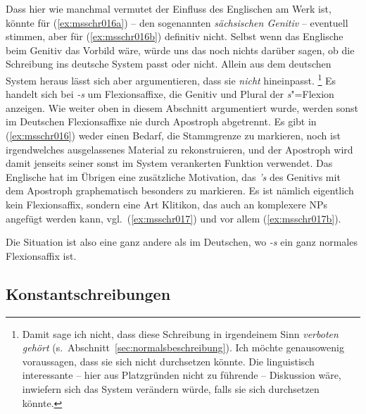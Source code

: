 Dass hier wie manchmal vermutet der Einfluss des Englischen am Werk ist, könnte für (\ref{ex:msschr016a}) -- den sogenannten \textit{sächsischen Genitiv} -- eventuell stimmen, aber für (\ref{ex:msschr016b}) definitiv nicht.
Selbst wenn das Englische beim Genitiv das Vorbild wäre, würde uns das noch nichts darüber sagen, ob die Schreibung ins deutsche System passt oder nicht.
Allein aus dem deutschen System heraus lässt sich aber argumentieren, dass sie \textit{nicht} hineinpasst.%
\footnote{Damit sage ich nicht, dass diese Schreibung in irgendeinem Sinn \textit{verboten gehört} (s.\ Abschnitt~\ref{sec:normalsbeschreibung}).
Ich möchte genausowenig voraussagen, dass sie sich nicht durchsetzen könnte.
Die linguistisch interessante -- hier aus Platzgründen nicht zu führende -- Diskussion wäre, inwiefern sich das System verändern würde, falls sie sich durchsetzen könnte.}
Es handelt sich bei \textit{-s} um Flexionsaffixe, die Genitiv und Plural der \textit{s}"=Flexion anzeigen.
Wie weiter oben in diesem Abschnitt argumentiert wurde, werden sonst im Deutschen Flexionsaffixe nie durch Apostroph abgetrennt.
Es gibt in (\ref{ex:msschr016}) weder einen Bedarf, die Stammgrenze zu markieren, noch ist irgendwelches ausgelassenes Material zu rekonstruieren, und der Apostroph wird damit jenseits seiner sonst im System verankerten Funktion verwendet.
Das Englische hat im Übrigen eine zusätzliche Motivation, das \textit{'s} des Genitivs mit dem Apostroph graphematisch besonders zu markieren.
Es ist nämlich eigentlich kein Flexionsaffix, sondern eine Art Klitikon, das auch an komplexere NPs angefügt werden kann, vgl.\ (\ref{ex:msschr017}) und vor allem (\ref{ex:msschr017b}).


\begin{exe}
  \ex\label{ex:msschr017} 
  \begin{xlist}
  \end{xlist}
\end{exe}

Die Situation ist also eine ganz andere als im Deutschen, wo \textit{-s} ein ganz normales Flexionsaffix ist.

\subsection{Konstantschreibungen}

\label{sec:konstanz}

